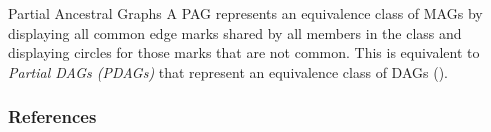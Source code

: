 \documentclass[english, compress, red]{beamer}
\begin{document}
\begin{frame}{Partial Ancestral Graphs}
	A PAG represents an equivalence class of MAGs by displaying all common edge marks shared by all members in the class and displaying circles for those marks that are not common. This is equivalent to \textit{Partial DAGs (PDAGs)} that represent an equivalence class of DAGs (\cite{spirtes2000causation}).
\end{frame}


\nocite{*}

\begin{frame}[t, allowframebreaks]
	\frametitle{References}
	\nocite{*}
	
\end{frame}
\end{document}
